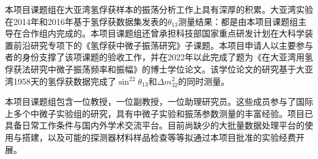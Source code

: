 \documentclass[a4paper,zihao=-4]{article}
\begin{document}



本项目课题组在大亚湾氢俘获样本的振荡分析工作上具有深厚的积累。大亚湾实验在2014年和2016年基于氢俘获数据集发表的$\theta_{13}$测量结果：都是由本项目课题组主导在合作组内完成的。本项目课题组还曾承担科技部国家重点研发计划在大科学装置前沿研究专项下的《氢俘获中微子振荡研究》子课题。本项目申请人以主要参与者的身份支撑了该项课题的验收工作，并在2022年以此完成了题为《在大亚湾用氢俘获法研究中微子振荡频率和振幅》的博士学位论文。该学位论文的研究基于大亚湾1958天的氢俘获数据完成了$\sin^22\theta_{13}$和$\Delta m_{32}^2$的同时测量。


本项目课题组包含一位教授，一位副教授，一位助理研究员。这些成员参与了国际上多个中微子实验组的研究，具有中微子实验和振荡参数测量的丰富经验。项目已具备日常工作条件与国内外学术交流平台。目前尚缺少的大批量数据处理平台的使用与搭建，以及可能的探测器材料样品检查等等拟通过本项目批准的实验经费开展。
\end{document}
